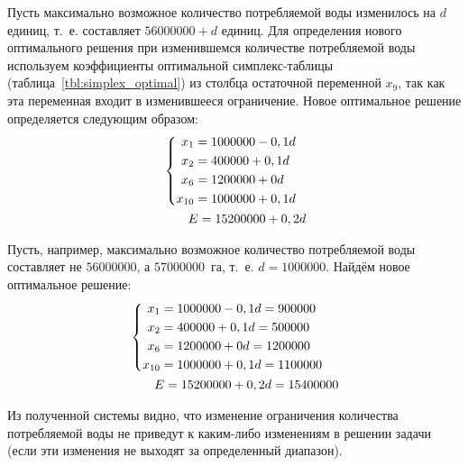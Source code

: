 Пусть максимально возможное количество потребляемой воды изменилось на $ d $ единиц, т.~е. составляет $ 56 000 000 + d $ единиц. Для определения нового оптимального решения при изменившемся количестве потребляемой воды используем коэффициенты оптимальной симплекс-таблицы (таблица~\ref{tbl:simplex_optimal}) из столбца остаточной переменной $ x_9 $, так как эта переменная входит в изменившееся ограничение. Новое оптимальное решение определяется следующим образом:
\begin{equation}
\label{eq:analysis_third}
	\begin{aligned}
  	&\left\{
    	\begin{aligned}
	      x_1 & = 1 000 000 - 0,1d \\
	      x_2 & = 400 000 + 0,1d \\
	      x_6 & = 1 200 000 + 0d \\
	      x_{10} & = 1 000 000 + 0,1d \\ 
    	\end{aligned}
  	\right.
  	\\
  	& \hspace{7mm} E = 15 200 000 + 0,2d
	\end{aligned}
\end{equation}

Пусть, например, максимально возможное количество потребляемой воды составляет не $ 56 000 000 $, а $ 57 000 000 $~га, т.~е. $ d = 1 000 000 $. Найдём новое оптимальное решение:
\begin{equation}
\label{eq:analysis_third_result}
	\begin{aligned}
  	&\left\{
    	\begin{aligned}
	      x_1 & = 1 000 000 - 0,1d = 900 000 \\
	      x_2 & = 400 000 + 0,1d = 500 000\\
	      x_6 & = 1 200 000 + 0d = 1 200 000 \\
	      x_{10} & = 1 000 000 + 0,1d = 1 100 000\\ 
    	\end{aligned}
  	\right.
  	\\
  	& \hspace{7mm} E = 15 200 000 + 0,2d = 15 400 000
	\end{aligned}
\end{equation}

Из полученной системы видно, что изменение ограничения количества потребляемой воды не приведут к каким-либо изменениям в решении задачи (если эти изменения не выходят за определенный диапазон).

